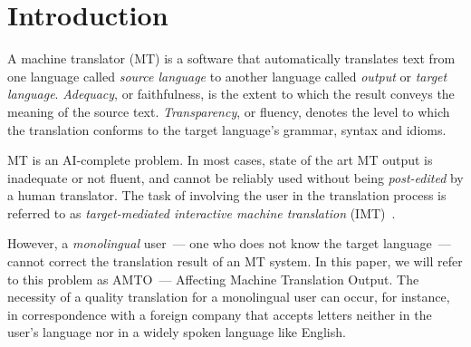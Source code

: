 \documentclass[hidelinks,10pt,letter]{article} %
\begin{document}
    \title{\rmfamily\normalfont{}}
    \author{}
    \date{}
    
    \maketitle
    
    \setcounter{tocdepth}{1}
    
    \newcommand{\dash}{~--- }
    
    \begin{abstract}
        \noindent This article proposes an extension for machine translators
        that aims to help users without knowledge of the target language to
        improve the quality of the translation. The extension highlights subphrases in the 
        source text according to the faithfulness of their translation and fluency
        in the source language. This allows users to assess
        the quality of the translation and eventually improve it by paraphrasing 
        the highlighted expressions.
    \end{abstract}
       
    \tableofcontents
    
    \section{Introduction}\label{sec:intro}
    
    A machine translator (MT) is a software that automatically translates text from one
    language called \textit{source language} to another language called \textit{output} 
    or \textit{target language}. \textit{Adequacy}, or faithfulness, is the extent to which the result conveys
    the meaning of the source text. \textit{Transparency}, or fluency, denotes the level to which the translation
    conforms to the target language's grammar, syntax and idioms. 
    
    MT is an AI-complete problem. In most cases,
    state of the art MT output is inadequate
    or not fluent, and cannot be reliably used without being \textit{post-edited} by a human
    translator.
    The task of involving the user in the translation process is referred to as 
    \textit{target-mediated interactive machine translation} (IMT)~\cite{huang1990machine,koehn2010enabling}. 
    
    However, a \textit{monolingual} user\dash one who does not know the target language\dash
    cannot correct the translation result of an MT system. In this paper, we will refer to this 
    problem as AMTO\dash Affecting Machine Translation Output.
    The necessity of a quality translation
    for a monolingual user can occur, for instance, in correspondence with
    a foreign company that accepts letters neither in the user's language nor
    in a widely spoken language like English.
    
\end{document}
